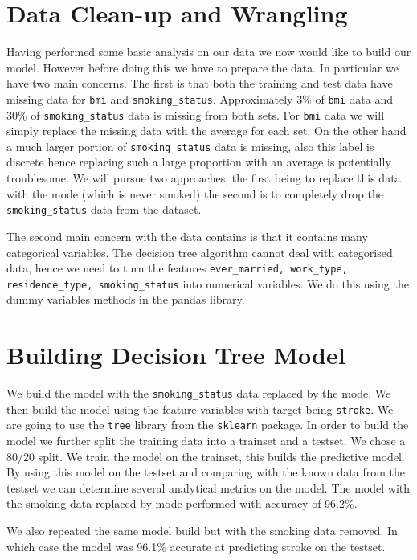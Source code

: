 \documentclass[10pt]{article}
\begin{document}
\section{Data Clean-up and Wrangling}
Having performed some basic analysis on our data we now would like to build our model. However before doing this we have to prepare the data. In particular we have two main concerns. The first is that both the training and test data have missing data for \texttt{bmi} and \texttt{smoking\_status}. Approximately 3\% of \texttt{bmi} data and 30\% of \texttt{smoking\_status} data is missing from both sets. For \texttt{bmi} data we will simply replace the missing data with the average for each set. On the other hand a much larger portion of \texttt{smoking\_status} data is missing, also this label is discrete hence replacing such a large proportion with an average is potentially troublesome. We will pursue two approaches, the first being to replace this data with the mode (which is never smoked) the second is to completely drop the \texttt{smoking\_status} data from the dataset.

The second main concern with the data contains is that it contains many categorical variables. The decision tree algorithm cannot deal with categorised data, hence we need to turn the features \texttt{ever\_married, work\_type, residence\_type, smoking\_status} into numerical variables. We do this using the dummy variables methods in the pandas library.
\section{Building Decision Tree Model}
We build the model with the \texttt{smoking\_status} data replaced by the mode. We then build the model using the feature variables with target being \texttt{stroke}. We are going to use the \texttt{tree} library from the \texttt{sklearn} package. In order to build the model we further split the training data into a trainset and a testset. We chose a $80/20$ split. We train the model on the trainset, this builds the predictive model. By using this model on the testset and comparing with the known data from the testset we can determine several analytical metrics on the model. The model with the smoking data replaced by mode performed with accuracy of 96.2\%.

We also repeated the same model build but with the smoking data removed. In which case the model was 96.1\% accurate at predicting stroke on the testset.
\end{document}
